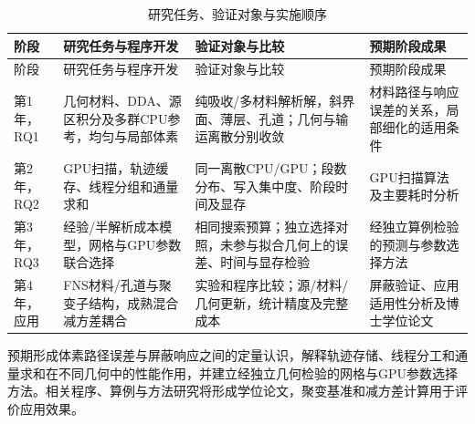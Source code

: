 \documentclass[UTF8, zihao=-4, fontset=none, a4paper]{ctexart}
\begin{document}
\begin{longtable}{@{}>{\raggedright\arraybackslash}p{}>{\raggedright\arraybackslash}p{}>{\raggedright\arraybackslash}p{}>{\raggedright\arraybackslash}p{}@{}}
\caption{研究任务、验证对象与实施顺序}\label{tab:6}\\
\toprule
阶段 & 研究任务与程序开发 & 验证对象与比较 & 预期阶段成果 \\
\midrule
\endfirsthead
\toprule
阶段 & 研究任务与程序开发 & 验证对象与比较 & 预期阶段成果 \\
\midrule
\endhead
\bottomrule
\endlastfoot
第1年，RQ1 & 几何材料、DDA、源区积分及多群CPU参考，均匀与局部体素 & 纯吸收/多材料解析解，斜界面、薄层、孔道；几何与输运离散分别收敛 & 材料路径与响应误差的关系，局部细化的适用条件 \\
第2年，RQ2 & GPU扫描，轨迹缓存、线程分组和通量求和 & 同一离散CPU/GPU；段数分布、写入集中度、阶段时间及显存 & GPU扫描算法及主要耗时分析 \\
第3年，RQ3 & 经验/半解析成本模型，网格与GPU参数联合选择 & 相同搜索预算；独立选择对照，未参与拟合几何上的误差、时间与显存检验 & 经独立算例检验的预测与参数选择方法 \\
第4年，应用 & FNS材料/孔道与聚变子结构，成熟混合减方差耦合 & 实验和程序比较；源/材料/几何更新，统计精度及完整成本 & 屏蔽验证、应用适用性分析及博士学位论文 \\
\end{longtable}

预期形成体素路径误差与屏蔽响应之间的定量认识，解释轨迹存储、线程分工和通量求和在不同几何中的性能作用，并建立经独立几何检验的网格与GPU参数选择方法。相关程序、算例与方法研究将形成学位论文，聚变基准和减方差计算用于评价应用效果。
\end{document}
